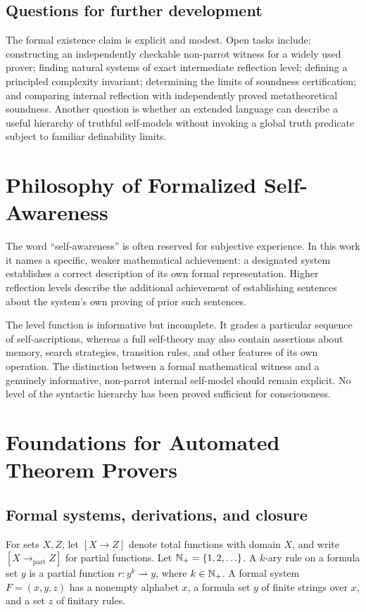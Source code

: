 \documentclass[11pt,letterpaper]{article}
\begin{document}
\subsection{Questions for further development}
The formal existence claim is explicit and modest. Open tasks include: constructing an independently checkable non-parrot witness for a widely used prover; finding natural systems of exact intermediate reflection level; defining a principled complexity invariant; determining the limits of soundness certification; and comparing internal reflection with independently proved metatheoretical soundness. Another question is whether an extended language can describe a useful hierarchy of truthful self-models without invoking a global truth predicate subject to familiar definability limits.

\section{Philosophy of Formalized Self-Awareness}
The word ``self-awareness'' is often reserved for subjective experience. In this work it names a specific, weaker mathematical achievement: a designated system establishes a correct description of its own formal representation. Higher reflection levels describe the additional achievement of establishing sentences about the system's own proving of prior such sentences.

The level function is informative but incomplete. It grades a particular sequence of self-ascriptions, whereas a full self-theory may also contain assertions about memory, search strategies, transition rules, and other features of its own operation. The distinction between a formal mathematical witness and a genuinely informative, non-parrot internal self-model should remain explicit. No level of the syntactic hierarchy has been proved sufficient for consciousness.

\appendix
\section{Foundations for Automated Theorem Provers}\label{app:foundations}
\subsection{Formal systems, derivations, and closure}
For sets $X,Z$, let $[X\to Z]$ denote total functions with domain $X$, and write $[X\to_{\mathrm{part}}Z]$ for partial functions. Let $\mathbb N_{+}=\{1,2,\ldots\}$. A $k$-ary rule on a formula set $y$ is a partial function $r:y^k\rightharpoonup y$, where $k\in\mathbb N_{+}$. A formal system $F=(x,y,z)$ has a nonempty alphabet $x$, a formula set $y$ of finite strings over $x$, and a set $z$ of finitary rules.
\end{document}
